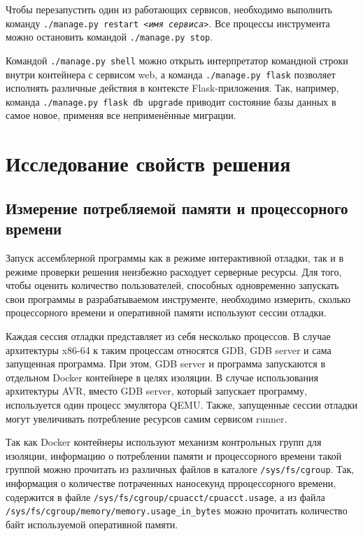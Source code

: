 \documentclass[a4paper,article,14pt]{extarticle}
\begin{document}
Чтобы перезапустить один из работающих сервисов, необходимо выполнить команду \texttt{./manage.py restart \textit{<имя сервиса>}}. Все процессы инструмента можно остановить командой \texttt{./manage.py stop}.

Командой \texttt{./manage.py shell} можно открыть интерпретатор командной строки внутри контейнера с сервисом web, а команда \texttt{./manage.py flask} позволяет исполнять различные действия в контексте Flask-приложения. Так, например, команда \texttt{./manage.py flask db upgrade} приводит состояние базы данных в самое новое, применяя все неприменённые миграции.

\pagebreak
\section{Исследование свойств решения}

\subsection{Измерение потребляемой памяти и процессорного времени}

Запуск ассемблерной программы как в режиме интерактивной отладки, так и в режиме проверки решения неизбежно расходует серверные ресурсы. Для того, чтобы оценить количество пользователей, способных одновременно запускать свои программы в разрабатываемом инструменте, необходимо измерить, сколько процессорного времени и оперативной памяти используют сессии отладки.

Каждая сессия отладки представляет из себя несколько процессов. В случае архитектуры x86-64 к таким процессам относятся GDB, GDB server и сама запущенная программа. При этом, GDB server и программа запускаются в отдельном Docker контейнере в целях изоляции. В случае использования архитектуры AVR, вместо GDB server, который запускает программу, используется один процесс эмулятора QEMU. Также, запущенные сессии отладки могут увеличивать потребление ресурсов самим сервисом runner.

Так как Docker контейнеры используют механизм контрольных групп для изоляции, информацию о потреблении памяти и процессорного времени такой группой можно прочитать из различных файлов в каталоге \texttt{/sys/fs/cgroup}. Так, информация о количестве потраченных наносекунд прроцессорного времени, содержится в файле \texttt{/sys/fs/cgroup/cpuacct/cpuacct.usage}, а из файла \texttt{/sys/fs/cgroup/memory/memory.usage\_in\_bytes} можно прочитать количество байт используемой оперативной памяти.
\end{document}
